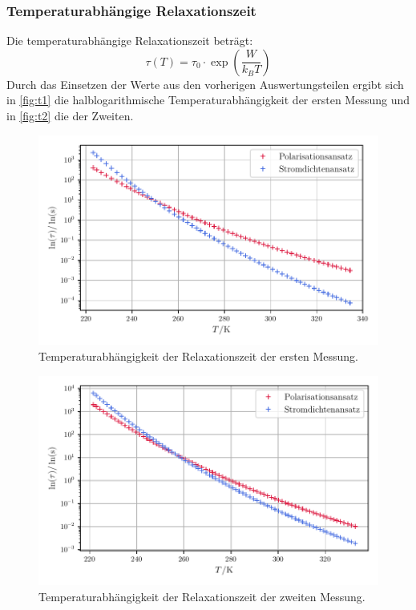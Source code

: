 \subsubsection{Temperaturabhängige Relaxationszeit}
Die temperaturabhängige Relaxationszeit beträgt:
\begin{equation}
    \tau(T) = \tau_0 \cdot \exp\left(\frac{W}{k_B T}\right)
\end{equation}
Durch das Einsetzen der Werte aus den vorherigen Auswertungsteilen ergibt sich in \autoref{fig:t1} die halblogarithmische Temperaturabhängigkeit der ersten Messung und
in \autoref{fig:t2} die der Zweiten.
\begin{figure}
    \centering
    \includegraphics[width=0.8\linewidth]{scripts/build/plot1_t.pdf}
    \caption{Temperaturabhängigkeit der Relaxationszeit der ersten Messung.}
    \label{fig:t1}
\end{figure}
\begin{figure}
    \centering
    \includegraphics[width=0.8\linewidth]{scripts/build/plot2_t.pdf}
    \caption{Temperaturabhängigkeit der Relaxationszeit der zweiten Messung.}
    \label{fig:t2}
\end{figure}